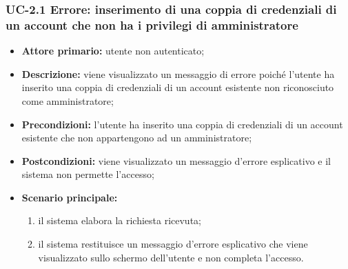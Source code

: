 \subsubsection{UC-2.1 Errore: inserimento di una coppia di credenziali di un account che non ha i privilegi di amministratore}
\begin{itemize}
	\item \textbf{Attore primario:} utente non autenticato;

	\item \textbf{Descrizione:} viene visualizzato un messaggio di errore poiché l'utente ha inserito una coppia di credenziali di un account esistente non riconosciuto come amministratore;

	\item \textbf{Precondizioni:} l'utente ha inserito una coppia di credenziali di un account esistente che non appartengono ad un amministratore;

	\item \textbf{Postcondizioni:} viene visualizzato un messaggio d'errore esplicativo e il sistema non permette l'accesso;

	\item \textbf{Scenario principale:}
	      \begin{enumerate}
		      \item il sistema elabora la richiesta ricevuta;
		      \item il sistema restituisce un messaggio d'errore esplicativo che viene visualizzato sullo schermo dell'utente e non completa l'accesso.
	      \end{enumerate}
\end{itemize}

